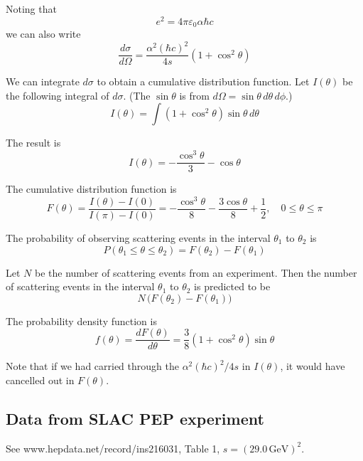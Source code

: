 \documentclass[12pt]{article}
\begin{document}
Noting that
\begin{equation*}
e^2=4\pi\varepsilon_0\alpha\hbar c
\end{equation*}
we can also write
\begin{equation*}
\frac{d\sigma}{d\Omega}=\frac{\alpha^2(\hbar c)^2}{4s}\left(1+\cos^2\theta\right)
\end{equation*}

We can integrate $d\sigma$ to obtain a cumulative distribution function.
Let $I(\theta)$ be the following integral of $d\sigma$.
(The $\sin\theta$ is from $d\Omega=\sin\theta\,d\theta\,d\phi$.)
\begin{equation*}
I(\theta)=\int
\left(1+\cos^2\theta\right)
\sin\theta\,d\theta
\end{equation*}

The result is
\begin{equation*}
I(\theta)=-\frac{\cos^3\theta}{3}-\cos\theta
\end{equation*}

The cumulative distribution function is
\begin{equation*}
F(\theta)=\frac{I(\theta)-I(0)}{I(\pi)-I(0)}
=-\frac{\cos^3\theta}{8}-\frac{3\cos\theta}{8}+\frac{1}{2},
\quad
0\le\theta\le\pi
\end{equation*}

The probability of observing scattering events in the interval $\theta_1$ to $\theta_2$ is
\begin{equation*}
P(\theta_1\le\theta\le\theta_2)=F(\theta_2)-F(\theta_1)
\end{equation*}

Let $N$ be the number of scattering events from an experiment.
Then the number of scattering events in the interval $\theta_1$
to $\theta_2$ is predicted to be
$$
N\,\bigl(F(\theta_2)-F(\theta_1)\bigr)
$$

The probability density function is
$$
f(\theta)=\frac{dF(\theta)}{d\theta}
=\frac{3}{8}
\left(1+\cos^2\theta\right)
\sin\theta
$$

Note that if we had carried through the $\alpha^2(\hbar c)^2/4s$ in $I(\theta)$,
it would have cancelled out in $F(\theta)$.

\subsection*{Data from SLAC PEP experiment}
See www.hepdata.net/record/ins216031, Table 1, $s=(29.0\,\text{GeV})^2$.
\end{document}

